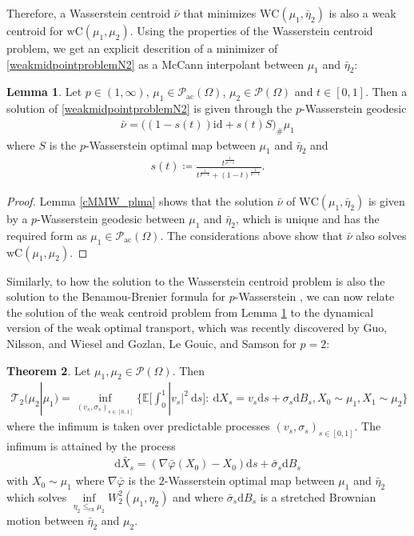 \documentclass[letterpaper]{amsart}
\newcommand{\dd}{\mathrm{d}}
\theoremstyle{definition}
\newtheorem{thm}{Theorem}[section]
\newtheorem{lma}[thm]{Lemma}
\begin{document}
Therefore, a Wasserstein centroid $\bar\nu$ that minimizes $\text{WC}(\mu_1,\bar\eta_2)$ is also a weak centroid for $\text{wC}(\mu_1,\mu_2)$.
Using the properties of the Wasserstein centroid problem, we get an explicit descrition of a minimizer of \eqref{weakmidpointproblemN2} as a McCann interpolant \cite{mccann1997} between $\mu_1$ and $\bar\eta_2$:
\begin{lma}\label{dynamicalweakbarthm}
	Let $p\in(1,\infty)$, $\mu_1\in\mathcal P_{\text{ac}}(\Omega)$, $\mu_2\in\mathcal P(\Omega)$ and $t\in[0,1]$. Then a solution of \eqref{weakmidpointproblemN2} is given through the $p$-Wasserstein geodesic
	\begin{gather*}
		\bar\nu=\big((1-s(t))\text{id}+s(t)S\big)_{\#}\mu_1
	\end{gather*}
	where $S$ is the $p$-Wasserstein optimal map between $\mu_1$ and $\bar\eta_2$ and
	\begin{gather*}
		s(t)\coloneqq\frac{t^{\frac{1}{p-1}}}{t^{\frac{1}{p-1}}+(1-t)^{\frac{1}{p-1}}}.
	\end{gather*}
\end{lma}
\begin{proof}
		Lemma \ref{cMMW_plma} shows that the solution $\bar\nu$ of $\text{WC}(\mu_1,\bar\eta_2)$ is given by a $p$-Wasserstein geodesic between $\mu_1$ and $\bar\eta_2$, which is unique and has the required form \cite[Thm 5.27]{santambrogio2015} as $\mu_1\in\mathcal P_{\text{ac}}(\Omega)$. The considerations above show that $\bar\nu$ also solves $\text{wC}(\mu_1,\mu_2)$.
\end{proof}
Similarly, to how the solution to the Wasserstein centroid problem is also the solution to the Benamou-Brenier formula for $p$-Wasserstein \cite[6.2]{agueh2011}, we can now relate the solution of the weak centroid problem from Lemma \ref{dynamicalweakbarthm} to the dynamical version of the weak optimal transport, which was recently discovered by
Guo, Nilsson, and Wiesel \cite{guo2026} and Gozlan, Le Gouic, and Samson \cite{gozlan2025} for $p=2$:
\begin{thm}\cite[Thm 2]{guo2026}\cite[Thm 9]{gozlan2025}\label{guoweakbbthm}
	Let $\mu_1,\mu_2\in\mathcal P(\Omega)$. Then
	\begin{gather*}
		\mathcal T_2(\mu_2|\mu_1)=\inf_{(v_s,\sigma_s)_{s\in[0,1]}}\Big\{\mathbb{E}\Big[\int_0^1|v_s|^2\ \dd s\Big]:\ \dd X_s=v_s\dd s+\sigma_s\dd B_s, X_0\sim\mu_1,X_1\sim\mu_2\Big\}
	\end{gather*}
	where the infimum is taken over predictable processes $(v_s,\sigma_s)_{s\in[0,1]}$.
	The infimum is attained by the process
	\begin{gather*}
		\dd \bar X_s=(\nabla\bar\varphi(X_0)-X_0)\dd s+\bar\sigma_s\dd B_s
	\end{gather*}
	with $X_0\sim\mu_1$
	where $\nabla\bar\varphi$ is the $2$-Wasserstein optimal map between $\mu_1$ and $\bar\eta_2$ which solves $\inf\limits_{\eta_2\leq_{\text{cx}}\mu_2}W_2^2(\mu_1,\eta_2)$ and where $\bar\sigma_s\dd B_s$ is a stretched Brownian motion between $\bar\eta_2$ and $\mu_2$.
\end{thm}
\end{document}
